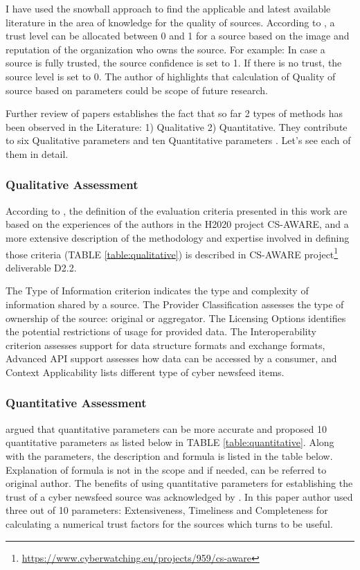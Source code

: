 I have used the snowball \citep{wohlin2014guidelines} approach 
to find the applicable and latest available literature 
in the area of knowledge for the  quality of sources. 
According to \cite{mokaddem2019taxonomy}, 
a trust level can be allocated between 0 and 1 
for a source based on the image and reputation of the organization 
who owns the source. 
For example: In case a source is fully trusted, 
the source confidence is set to 1. 
If there is no trust, the source level is set to 0. 
The author of \citep{mokaddem2019taxonomy} highlights 
that calculation of Quality of source based on parameters 
could be scope of future research.

Further review of papers establishes the fact that so far 2 types of methods has been observed in the Literature: 
1) Qualitative 
2) Quantitative. 
They contribute to six Qualitative parameters and ten Quantitative parameters
\citep{schaberreiter2019quantitative}. Let’s see each of them in detail. 



\subsubsection{ Qualitative Assessment}
According to \cite{schaberreiter2019quantitative}, the definition of the evaluation criteria presented in this work are based on the experiences of the authors in the H2020 project CS-AWARE, and a more extensive description of the methodology and expertise involved in defining those criteria
(TABLE \ref{table:qualitative})
is described in CS-AWARE project\footnote{\url{https://www.cyberwatching.eu/projects/959/cs-aware}} deliverable D2.2.

The Type of Information criterion indicates the type and complexity of information shared by a source. 
The Provider Classification assesses the type of ownership of the source: original or aggregator. 
The Licensing Options identifies the potential restrictions of usage for provided data. 
The Interoperability criterion assesses support for data structure formats and exchange formats, Advanced API support assesses how data can be accessed by a consumer, and Context Applicability lists different type of cyber newsfeed items.

\subsubsection{ Quantitative Assessment}
\cite{schaberreiter2019quantitative} argued that quantitative parameters can be more accurate and proposed 10 quantitative parameters as listed below in TABLE \ref{table:quantitative}. 
Along with the parameters, the description and formula is listed in the table below. Explanation of formula is not in the scope and if needed, can be referred to original author. 
The benefits of using quantitative parameters for establishing the trust of a cyber newsfeed source was acknowledged by \cite{ermerins2020scoring}. 
In this paper author used three out of 10 parameters: Extensiveness, Timeliness and Completeness for calculating a numerical  trust factors for the sources which turns to be useful.

